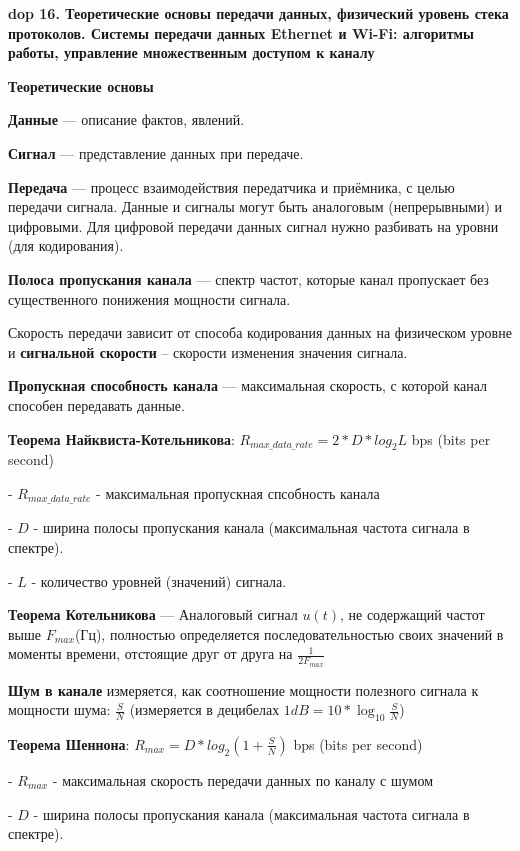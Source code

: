 \textbf{\LARGE dop 16. Теоретические основы передачи данных, физический уровень стека протоколов. Системы передачи данных Ethernet и Wi-Fi: алгоритмы работы, управление множественным доступом к каналу}

\textbf{Теоретические основы}


\textbf{Данные} --- описание фактов, явлений.

\textbf{Сигнал} --- представление данных при передаче.

\textbf{Передача} --- процесс взаимодействия передатчика и приёмника, с целью передачи сигнала.
Данные и сигналы могут быть аналоговым (непрерывными) и цифровыми.
Для цифровой передачи данных сигнал нужно разбивать на уровни (для кодирования).

\textbf{Полоса пропускания канала} --- спектр частот, которые канал пропускает без существенного понижения мощности сигнала.

Скорость передачи зависит от способа кодирования данных на физическом уровне и \textbf{сигнальной скорости} -- скорости изменения значения сигнала.

\textbf{Пропускная способность канала} --- максимальная скорость, с которой канал способен передавать данные.

\bigbreak
\textbf{Теорема Найквиста-Котельникова}: $R_{max\_data\_rate} = 2*D*log_2{L}$ bps (bits per second)

- $R_{max\_data\_rate}$ - максимальная пропускная спсобность канала

- $D$ - ширина полосы пропускания канала (максимальная частота сигнала в спектре).

- $L$ - количество уровней (значений) сигнала.

\bigbreak
\textbf{Теорема Котельникова} --- Аналоговый сигнал $u(t)$, не содержащий частот выше $F_{max}$(Гц), полностью определяется последовательностью своих значений в моменты времени, отстоящие друг от друга на $\frac{1}{2F_{max}}$

\bigbreak
\textbf{Шум в канале} измеряется, как соотношение мощности полезного сигнала к мощности шума: $\frac{S}{N}$ (измеряется в децибелах $1dB = 10*\log_{10}{\frac{S}{N}}$)

\bigbreak
\textbf{Теорема Шеннона}: $R_{max} = D*log_2{(1+\frac{S}{N})}$ bps (bits per second)

- $R_{max}$ - максимальная скорость передачи данных по каналу с шумом

- $D$ - ширина полосы пропускания канала (максимальная частота сигнала в спектре).

